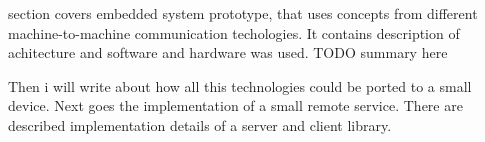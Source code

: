  section covers embedded system prototype, that uses
concepts from different machine-to-machine communication techologies. It
contains description of achitecture and software and hardware was used. 
TODO summary here

Then i will write about how all
this technologies could be ported to a small device.
Next goes the implementation of a small remote service. 
There are described implementation details of a server and client library.
